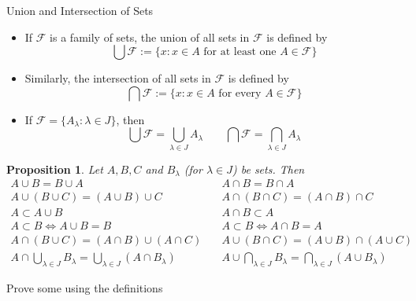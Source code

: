 \documentclass[9pt,aspectratio=169]{beamer}
\newcommand{\fF}{\mathcal F}
\renewcommand{\iff}{\Leftrightarrow}
\newtheorem{proposition}[theorem]{Proposition}
\begin{document}
\begin{frame}[allowframebreaks]{Union and Intersection of Sets}
    \begin{definition}
        \begin{itemize}
            \item If $\fF$ is a family of sets, the union of all sets in
            $\fF$ is defined by
            \begin{equation*}
                \bigcup \fF := \{x: x\in A \text{ for at least one } A \in \fF\}
            \end{equation*}
            \item Similarly, the intersection of all sets in $\fF$ is defined by
            \begin{equation*}
                \bigcap \fF := \{x: x\in A \text{ for every } A \in \fF\}
            \end{equation*}
            \item If $\fF = \{A_\lambda: \lambda \in J\}$, then
            \begin{equation*}
                \bigcup \fF = \bigcup_{\lambda \in J} A_\lambda \qquad \bigcap \fF =
                \bigcap_{\lambda \in J} A_\lambda
            \end{equation*}
        \end{itemize}
    \end{definition}
    \framebreak
    \begin{proposition}
        Let $A, B, C$ and $B_\lambda$ (for $\lambda \in J$) be sets. Then
        \begin{align*}
            A \cup B = B \cup A &\quad A\cap B = B \cap A\\
            A \cup (B \cup C) = (A \cup B) \cup C &\quad
            A \cap (B \cap C) = (A \cap B) \cap C \\
            A \subset A \cup B &\quad A \cap B \subset A \\
            A \subset B \iff A\cup B = B &\quad
            A \subset B \iff A \cap B = A\\
            A \cap (B \cup C) = (A \cap B) \cup (A \cap C) &\quad
            A \cup (B \cap C) = (A \cup B) \cap (A \cup C)\\
            A \cap \bigcup_{\lambda \in J} B_\lambda = \bigcup_{\lambda
              \in J} (A \cap B_\lambda) &\quad
            A \cup \bigcap_{\lambda \in J} B_\lambda = \bigcap_{\lambda
              \in J} (A \cup B_\lambda) 
        \end{align*}
    \end{proposition}
    Prove some using the definitions
\end{frame}
\end{document}
